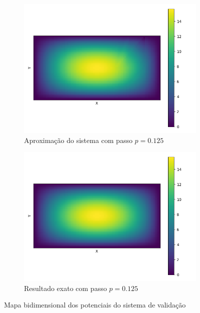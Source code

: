 \documentclass[oneside]{abntex2}
\begin{document}
\begin{figure}[h]
  \begin{subfigure}[b]{0.5\textwidth}
    \includegraphics[width=\textwidth]{imgs/hmap_aprox_val_1250.png}
    \caption{Aproximação do sistema com passo $p = 0.125$}
    \label{hmap_aprox_val_1250}
  \end{subfigure}
  \begin{subfigure}[b]{0.5\textwidth}
    \includegraphics[width=\textwidth]{imgs/hmap_grnd_val_1250.png}
    \caption{Resultado exato com passo $p = 0.125$}
    \label{hmap_exat_val_1250}
  \end{subfigure}
  \caption{Mapa bidimensional dos potenciais do sistema de validação}
\end{figure}
\end{document}
